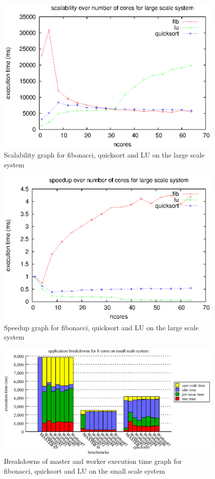 \begin{figure}[!ht]
\centering
\includegraphics[width=0.7\columnwidth]{figures/apps_scalability_beowulf}
\caption{Scalability graph for fibonacci, quicksort and LU on the large scale system}
\label{fig:apps_scalability_beowulf}
\end{figure}

\begin{figure}[!ht]
\centering
\includegraphics[width=0.7\columnwidth]{figures/apps_speedup_beowulf}
\caption{Speedup graph for fibonacci, quicksort and LU on the large scale system}
\label{fig:apps_speedup_beowulf}
\end{figure}

\begin{figure}[!ht]
\includegraphics[width=\columnwidth]{figures/app_breakdowns_minititan}
\caption{Breakdowns of master and worker execution time graph for fibonacci, quicksort and LU on the small scale system}
\label{fig:app_breakdowns_minititan}
\end{figure}

